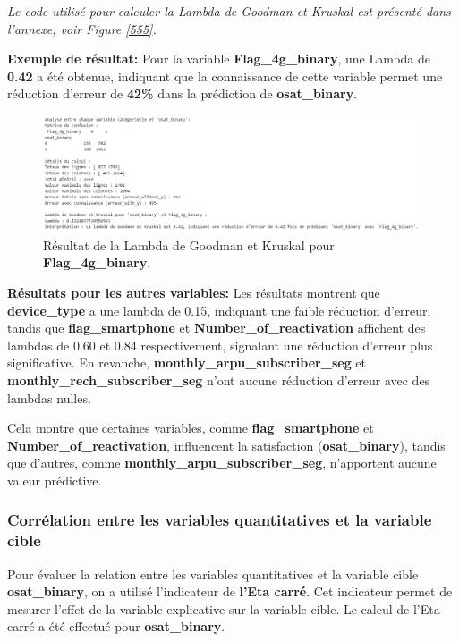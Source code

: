\textit{Le code utilisé pour calculer la Lambda de Goodman et Kruskal est présenté dans l'annexe, voir Figure \ref{555}.}

\textbf{\checkmark Exemple de résultat:} Pour la variable \textbf{Flag\_4g\_binary}, une Lambda de \textbf{0.42} a été obtenue, indiquant que la connaissance de cette variable permet une réduction d'erreur de \textbf{42\%} dans la prédiction de \textbf{osat\_binary}.

\begin{figure}[H]
    \centering
    \includegraphics[width=0.8\linewidth]{capture_sas_40.png}
    \caption{Résultat de la Lambda de Goodman et Kruskal pour \textbf{Flag\_4g\_binary}.}
\end{figure}

\textbf{\checkmark Résultats pour les autres variables:} Les résultats montrent que \textbf{device\_type} a une lambda de 0.15, indiquant une faible réduction d'erreur, tandis que \textbf{flag\_smartphone} et \textbf{Number\_of\_reactivation} affichent des lambdas de 0.60 et 0.84 respectivement, signalant une réduction d'erreur plus significative. En revanche, \textbf{monthly\_arpu\_subscriber\_seg} et \textbf{monthly\_rech\_subscriber\_seg} n'ont aucune réduction d'erreur avec des lambdas nulles.

Cela montre que certaines variables, comme \textbf{flag\_smartphone} et \textbf{Number\_of\_reactivation}, influencent la satisfaction (\textbf{osat\_binary}), tandis que d'autres, comme \textbf{monthly\_arpu\_subscriber\_seg}, n'apportent aucune valeur prédictive.

\subsubsection*{Corrélation entre les variables quantitatives et la variable cible}

Pour évaluer la relation entre les variables quantitatives et la variable cible \textbf{osat\_binary}, on a utilisé l'indicateur de \textbf{l'Eta carré}. Cet indicateur permet de mesurer l'effet de la variable explicative sur la variable cible. Le calcul de l'Eta carré a été effectué pour \textbf{osat\_binary}.

